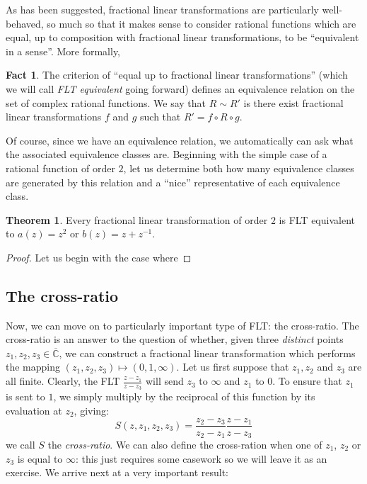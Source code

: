 \documentclass[aps,pra,showpacs,notitlepage,onecolumn,superscriptaddress,nofootinbib]{revtex4-1}
\theoremstyle{definition}
\newtheorem{theorem}{Theorem}[section]
\newtheorem{fact}{Fact}[section]
\begin{document}
\noindent As has been suggested, fractional linear transformations are particularly well-behaved, so much so that it makes sense to consider rational functions which are equal,
up to composition with fractional linear transformations, to be ``equivalent in a sense''. More formally,

\begin{fact}
  The criterion of ``equal up to fractional linear transformations'' (which we will call \emph{FLT equivalent} going forward) defines an equivalence relation on the set of complex rational functions. We say that $R \sim R'$ is there
  exist fractional linear transformations $f$ and $g$ such that $R' = f \circ R \circ g$.
 \end{fact}

\noindent Of course, since we have an equivalence relation, we automatically can ask what the associated equivalence classes are. Beginning with the simple case of a rational function of order $2$, let us determine both how
many equivalence classes are generated by this relation and a ``nice'' representative of each equivalence class.

\begin{theorem}
  Every fractional linear transformation of order $2$ is FLT equivalent to $a(z) = z^2$ or $b(z) = z + z^{-1}$.
\end{theorem}

\begin{proof}
  Let us begin with the case where 
  \end{proof}

\subsection{The cross-ratio}

\noindent Now, we can move on to particularly important type of FLT: the cross-ratio. The cross-ratio is an answer to the question of whether, given three \emph{distinct} points $z_1, z_2, z_3 \in \overline{\mathbb{C}}$, we
can construct a fractional linear transformation which performs the mapping $(z_1, z_2, z_3) \mapsto (0, 1, \infty)$. Let us first suppose that $z_1, z_2$ and $z_3$ are all finite. Clearly, the FLT $\frac{z - z_1}{z - z_3}$ will
send $z_3$ to $\infty$ and $z_1$ to $0$. To ensure that $z_1$ is sent to $1$, we simply multiply by the reciprocal of this function by its evaluation at $z_2$, giving:
\begin{equation}
  S(z, z_1, z_2, z_3) = \frac{z_2 - z_3}{z_2 - z_1} \frac{z - z_1}{z - z_3}
\end{equation}
we call $S$ the \emph{cross-ratio}. We can also define the cross-ration when one of $z_1$, $z_2$ or $z_3$ is equal to $\infty$: this just requires some casework so we will leave it as an exercise. We arrive next at a very important result:
\end{document}
